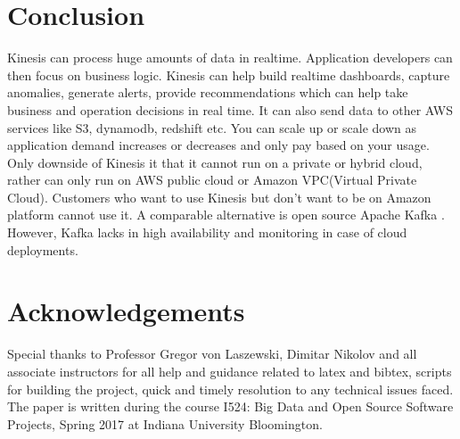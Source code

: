 \documentclass[9pt,twocolumn,twoside]{../../styles/osajnl}
\begin{document}
\section{Conclusion}
Kinesis can process huge amounts of data in realtime. Application developers can
then focus on business logic. Kinesis \cite{varia2014overview} can help build
realtime dashboards, capture anomalies, generate alerts, provide recommendations
which can help take business and operation decisions in real time. It can also
send data to other AWS services like S3, dynamodb, redshift etc. You can scale
up or scale down as application demand increases or decreases and only pay based
on your usage. Only downside of Kinesis it that it cannot run on a private or
hybrid cloud, rather can only run on AWS public cloud or Amazon VPC(Virtual
Private Cloud).  \CE Customers who want to use Kinesis but don't want to be on
Amazon platform cannot use it. A comparable alternative is open source Apache
Kafka \cite{deyhim2016kafka} .  However, Kafka lacks in high availability and
monitoring in case of cloud deployments.
\section*{Acknowledgements}
Special thanks to Professor Gregor von Laszewski, Dimitar Nikolov and all
associate instructors for all help and guidance related to latex and bibtex,
scripts for building the project, quick and timely resolution to any technical
issues faced. The paper is written during the course  {I524: Big Data and Open
Source Software Projects, Spring 2017} at Indiana University Bloomington.

\medskip

% 

\end{document}
